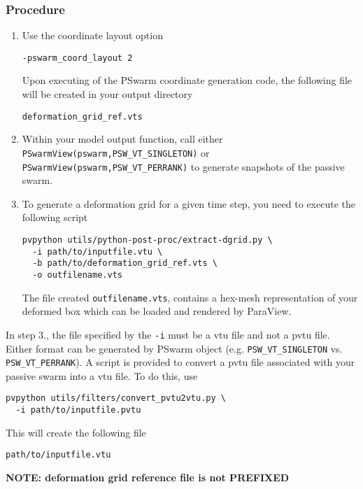 \documentclass[paper=a4, fontsize=10pt,twoside]{scrartcl}
\begin{document}
{{\subsubsection*{Procedure}
\begin{enumerate}

\item Use the coordinate layout option
\begin{lstlisting}
-pswarm_coord_layout 2
\end{lstlisting}
Upon executing of the PSwarm coordinate generation code, the following file will be created in your output directory
\begin{lstlisting}
deformation_grid_ref.vts
\end{lstlisting}

\item Within your model output function, call either
\texttt{PSwarmView(pswarm,PSW\_VT\_SINGLETON)}
or
\texttt{PSwarmView(pswarm,PSW\_VT\_PERRANK)}
to generate snapshots of the passive swarm.

\item To generate a deformation grid for a given time step, you need to execute the following script
\begin{lstlisting}
pvpython utils/python-post-proc/extract-dgrid.py \
  -i path/to/inputfile.vtu \
  -b path/to/deformation_grid_ref.vts \
  -o outfilename.vts
\end{lstlisting}
The file created {\tt outfilename.vts}, contains a hex-mesh representation of your deformed box which can be loaded and rendered by ParaView.
\end{enumerate}

In step 3., the file specified by the \texttt{-i} must be a vtu file and not a pvtu file.
Either format can be generated by PSwarm object (e.g. \texttt{PSW\_VT\_SINGLETON} vs. \texttt{PSW\_VT\_PERRANK}).
A script is provided to convert a pvtu file associated with your passive swarm into a vtu file.
To do this, use
\begin{lstlisting}
pvpython utils/filters/convert_pvtu2vtu.py \
  -i path/to/inputfile.pvtu
\end{lstlisting}

This will create the following file
\begin{lstlisting}
path/to/inputfile.vtu
\end{lstlisting}

\textbf{NOTE: deformation grid reference file is not PREFIXED}

}}
\end{document}
